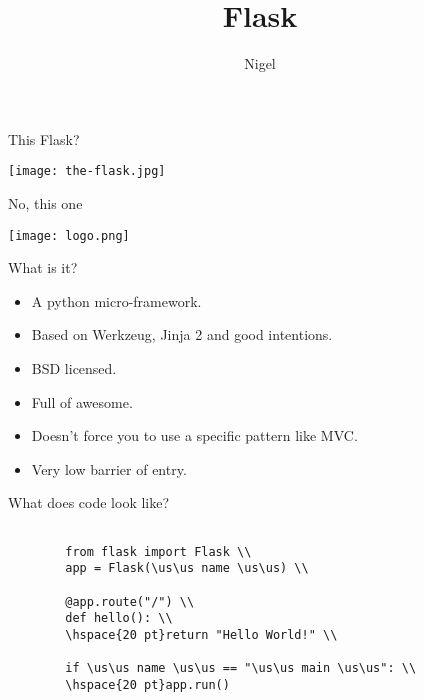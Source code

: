 \documentclass[xcolor=dvipsnames]{beamer}
\title{Flask}
\author[nigelb]{Nigel}
\date
\def\us{\char`\_}
\begin{document}
    \begin{frame}
        \titlepage
    \end{frame}

    \begin{frame}{This Flask?}
        \begin{center}
	    \texttt{[image: the-flask.jpg]}
	    \label{fig:the-flask}
        \end{center}
    \end{frame}

    \begin{frame}{No, this one}
        \begin{center}
	    \texttt{[image: logo.png]}
	    \label{fig:logo}
        \end{center}
    \end{frame}
    
    \begin{frame}{What is it?}
        \begin{itemize}
            \pause \item A python micro-framework.
            \pause \item Based on Werkzeug, Jinja 2 and good intentions.
            \pause \item BSD licensed.
            \pause \item Full of awesome.
            \pause \item Doesn't force you to use a specific pattern like MVC.
            \pause \item Very low barrier of entry.
        \end{itemize}
    \end{frame}

    \begin{frame}{What does code look like?}

    \begin{verbatim}
   
        from flask import Flask \\
        app = Flask(\us\us name \us\us) \\

        @app.route("/") \\
        def hello(): \\
        \hspace{20 pt}return "Hello World!" \\

        if \us\us name \us\us == "\us\us main \us\us": \\
        \hspace{20 pt}app.run()
        
    \end{verbatim}

    \end{frame}
\end{document}
